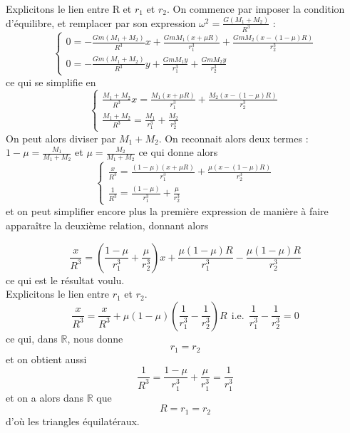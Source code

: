 \documentclass[20pt]{extarticle}
\theoremstyle{definition}
\theoremstyle{definition}
\begin{document}
	Explicitons le lien entre R et $r_{1}$ et $r_{2}$. On commence par imposer la condition d'équilibre, et remplacer par son expression $\omega^2 = \frac{G(M_1+M_2)}{R^3}$ :
	\begin{equation*}
		\begin{cases}
			0 = -\frac{Gm(M_1+M_2)}{R^3}x+\frac{GmM_1(x+\mu R)}{r_1^3}+\frac{GmM_2(x-(1-\mu)R)}{r_2^3}
			\\
			0 = -\frac{Gm(M_1+M_2)}{R^3}y+\frac{GmM_1y}{r_1^3}+\frac{GmM_2y}{r_2^3}
		\end{cases}
	\end{equation*}
	ce qui se simplifie en
	\begin{equation*}
		\begin{cases}
			\frac{M_1+M_2}{R^3}x = \frac{M_1(x+\mu R)}{r_1^3}+\frac{M_2(x-(1-\mu)R)}{r_2^3}
			\\
			\frac{M_1+M_2}{R^3} = \frac{M_1}{r_1^3}+\frac{M_2}{r_2^3}
		\end{cases}
	\end{equation*}
	On peut alors diviser par $M_1+M_2$. On reconnait alors deux termes : $1-\mu = \frac{M_1}{M_1+M_2}$ et $\mu = \frac{M_2}{M_1+M_2}$ ce qui donne alors
	\begin{equation*}
		\begin{cases}
			\frac{x}{R^3} = \frac{(1-\mu)(x+\mu R)}{r_1^3}+\frac{\mu(x-(1-\mu)R)}{r_2^3}
			\\
			\frac{1}{R^3} = \frac{(1-\mu)}{r_1^3}+\frac{\mu}{r_2^3}
		\end{cases}
	\end{equation*}
	et on peut simplifier encore plus la première expression de manière à faire apparaître la deuxième relation, donnant alors
	
	\begin{equation*}
		\frac{x}{R^3} = (\frac{1-\mu}{r_1^3} + \frac{\mu}{r_2^3})x + \frac{\mu(1-\mu)R}{r_1^3} - \frac{\mu(1-\mu)R}{r_2^3}
	\end{equation*}
	ce qui est le résultat voulu.
	\\
	
	Explicitons le lien entre $r_1$ et $r_2$.
	\begin{equation*}
		\frac{x}{R^3} = \frac{x}{R^3} + \mu(1-\mu)(\frac{1}{r_1^3}-\frac{1}{r_2^3})R \ \ \text{i.e.} \ \ \frac{1}{r_1^3}-\frac{1}{r_2^3} = 0
	\end{equation*}
	ce qui, dans $\mathbb{R}$, nous donne
	\begin{equation*}
		r_1=r_2
	\end{equation*}
	et on obtient aussi
	\begin{equation*}
		\frac{1}{R^3} = \frac{1-\mu}{r_1^3} + \frac{\mu}{r_1^3} = \frac{1}{r_1^3}
	\end{equation*}
	et on a alors dans $\mathbb{R}$ que
	\begin{equation*}
		R=r_1=r_2
	\end{equation*}
	d'où les triangles équilatéraux.
\end{document}
